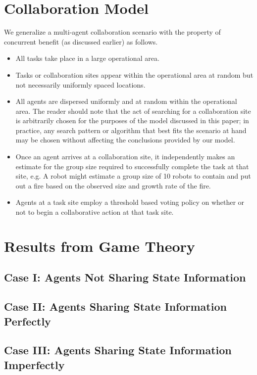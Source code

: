 \documentclass[conference]{IEEETran}
\begin{document}
\section{Collaboration Model}
We generalize a multi-agent collaboration scenario with the property of concurrent benefit (as discussed earlier) as follows.
\begin{itemize}
	\item All tasks take place in a large operational area.
	\item Tasks or collaboration sites appear within the operational area at random but not necessarily uniformly spaced locations.
	\item All agents are dispersed uniformly and at random within the operational area. The reader should note that the act of searching for a collaboration site is arbitrarily chosen for the purposes of the model discussed in this paper; in practice, any search pattern or algorithm that best fits the scenario at hand may be chosen without affecting the conclusions provided by our model.
	\item Once an agent arrives at a collaboration site, it independently makes an estimate for the group size required to successfully complete the task at that site, e.g. A robot might estimate a group size of 10 robots to contain and put out a fire based on the observed size and growth rate of the fire.
	\item Agents at a task site employ a threshold based voting policy on whether or not to begin a collaborative action at that task site. 
\end{itemize}


\section{Results from Game Theory}
\subsection{Case I: Agents Not Sharing State Information}

\subsection{Case II: Agents Sharing State Information Perfectly}

\subsection{Case III: Agents Sharing State Information Imperfectly}
\end{document}
